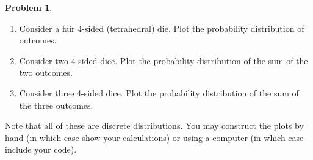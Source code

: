 \documentclass[10pt]{article}
\theoremstyle{definition}
\newtheorem{problem}{Problem}
\begin{document}
\begin{problem}~
\begin{enumerate}[label=(\alph*)]
  \item Consider a fair 4-sided (tetrahedral) die. Plot the probability distribution of outcomes.
  \item Consider two 4-sided dice. Plot the probability distribution of the sum of the two outcomes.
  \item Consider three 4-sided dice. Plot the probability distribution of the sum of the three
        outcomes.
\end{enumerate}
Note that all of these are discrete distributions. You may construct the plots by hand (in
which case show your calculations) or using a computer (in which case include your code).
\end{problem}
\end{document}
